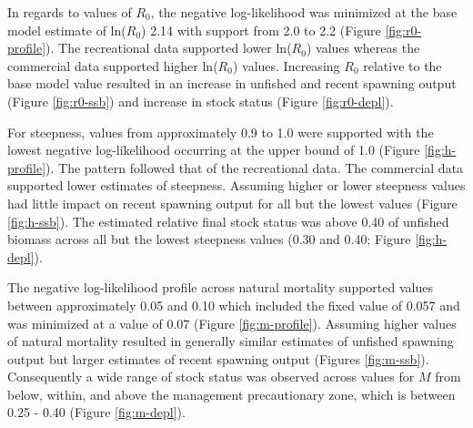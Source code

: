 \documentclass[11pt,
  english,
  a4paper,
]{article}
\begin{document}
\leavevmode\tagmcend\tagstructend\par


In regards to values of {\(R_0\)\leavevmode\tagmcend\tagstructend}, the negative log-likelihood was minimized at the base model estimate of ln({\(R_0\)\leavevmode\tagmcend\tagstructend}) 2.14 with support from 2.0 to 2.2 (Figure \ref{fig:r0-profile}). The recreational data supported lower ln({\(R_0\)\leavevmode\tagmcend\tagstructend}) values whereas the commercial data supported higher ln({\(R_0\)\leavevmode\tagmcend\tagstructend}) values. Increasing {\(R_0\)\leavevmode\tagmcend\tagstructend} relative to the base model value resulted in an increase in unfished and recent spawning output (Figure \ref{fig:r0-ssb}) and increase in stock status (Figure \ref{fig:r0-depl}).

\leavevmode\tagmcend\tagstructend\par


For steepness, values from approximately 0.9 to 1.0 were supported with the lowest negative log-likelihood occurring at the upper bound of 1.0 (Figure \ref{fig:h-profile}). The pattern followed that of the recreational data. The commercial data supported lower estimates of steepness. Assuming higher or lower steepness values had little impact on recent spawning output for all but the lowest values (Figure \ref{fig:h-ssb}). The estimated relative final stock status was above 0.40 of unfished biomass across all but the lowest steepness values (0.30 and 0.40; Figure \ref{fig:h-depl}).

\leavevmode\tagmcend\tagstructend\par


The negative log-likelihood profile across natural mortality supported values between approximately 0.05 and 0.10 which included the fixed value of 0.057 and was minimized at a value of 0.07 (Figure \ref{fig:m-profile}). Assuming higher values of natural mortality resulted in generally similar estimates of unfished spawning output but larger estimates of recent spawning output (Figures \ref{fig:m-ssb}). Consequently a wide range of stock status was observed across values for {\(M\)\leavevmode\tagmcend\tagstructend} from below, within, and above the management precautionary zone, which is between 0.25 - 0.40 (Figure \ref{fig:m-depl}).
\end{document}
